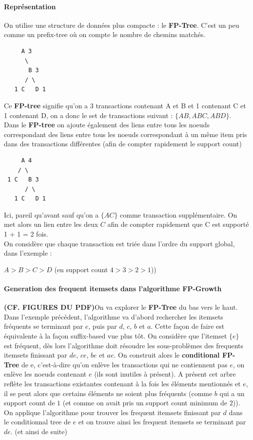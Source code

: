 \documentclass{article}
\begin{document}
\begin{sffamily}
\paragraph{Représentation} On utilise une structure de données plus compacte : le \textbf{FP-Tree}. C'est un peu comme un prefix-tree où on 
compte le nombre de chemins matchés.
\begin{verbatim}
     A 3
      \ 
       B 3
      / \ 
   1 C   D 1
\end{verbatim}
Ce \textbf{FP-tree} signifie qu'on a 3 transactions contenant A et B et 1 contenant C et 1 contenant D, on a donc le set de transactions 
suivant : $\{AB,ABC,ABD\}$. \\
Dans le \textbf{FP-tree} on ajoute également des liens entre tous les noeuds correspondant des liens entre tous les noeuds correspondant à 
un même item pris dans des transactions différentes (afin de compter rapidement le support count)
\begin{verbatim}
     A 4
    / \ 
 1 C   B 3
      / \ 
   1 C   D 1 
\end{verbatim}
Ici, pareil qu'avant sauf qu'on a $\{AC\}$ comme transaction supplémentaire. On met alors un lien entre les deux $C$ afin de compter 
rapidement que C est supporté 1 + 1 = 2 fois. \\
   
On considère que chaque transaction est triée dans l'ordre du support global, dans l'exemple :\\
\begin{center}
$A > B > C > D$ (en support count $4>3>2>1$))
\end{center}

\paragraph{Generation des frequent itemsets dans l'algorithme FP-Growth} \textbf{(CF. FIGURES DU PDF)}On va explorer le \textbf{FP-Tree} du 
bas vers le haut. Dans l'exemple précédent, l'algorithme va d'abord rechercher les itemsets fréquents se terminant par $e$, puis par $d$, 
$c$, $b$ et $a$. Cette façon de faire est équivalente à la façon suffix-based vue plus tôt. On considère que l'itemset $\{e\}$ est 
fréquent, dès lors l'algorithme doit résoudre les sous-problèmes des frequents itemsets finissant par $de$, $ce$, $be$ et $ae$. On 
construit alors le \textbf{conditional FP-Tree} de e, c'est-à-dire qu'on enlève les transactions qui ne contiennent pas $e$, on enlève les 
noeuds contenant $e$ (ils sont inutiles à présent). A présent cet arbre reflète les transactions existantes contenant à la fois les 
éléments mentionnés et $e$, il se peut alors que certains éléments ne soient plus fréquents (comme $b$ qui a un support count de $1$ (et 
comme on avait pris un support count minimum de $2$)). On applique l'algorithme pour trouver les frequent itemsets finissant par $d$ dans 
le conditionnal tree de $e$ et on trouve ainsi les frequent itemsets se terminant par $de$. (et ainsi de suite)



\end{sffamily}
\end{document}
